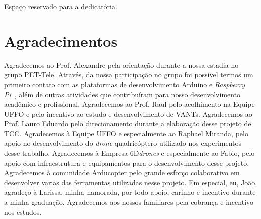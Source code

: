 \documentclass[12pt,a4paper,oneside]{book}
\begin{document}



\begin{flushright}
 \begin{minipage}{0.5\textwidth}
  \vspace{17.0cm} 
  Espaço reservado para a dedicatória.
 \end{minipage}
\end{flushright}






\chapter*{Agradecimentos}

\thispagestyle{myheadings}
%
Agradecemos ao Prof. Alexandre pela orientação durante a nossa estadia no grupo PET-Tele. Através, 
da nossa participação no grupo foi possível termos um primeiro contato com as plataformas de desenvolvimento 
Arduino e \textit{Raspberry Pi}~\cite{url:raspberrypi}, além de outras atividades que contribuíram para nosso
desenvolvimento acadêmico e profissional.
%
Agradecemos ao Prof. Raul pelo acolhimento na Equipe UFFO e pelo incentivo ao estudo e desenvolvimento 
de VANTs. 
%
Agradecemos ao Prof. Lauro Eduardo pelo direcionamento durante a elaboração desse projeto de TCC. 
%
Agradecemos à Equipe UFFO e especialmente ao Raphael Miranda, pelo apoio no desenvolvimento do \textit{drone} quadricóptero 
utilizado nos experimentos desse trabalho. 
%
Agradecemos à Empresa 6D\textit{drones} e especialmente ao Fabio, pelo apoio com infraestrutura e equipamentos para o desenvolvimento 
desse projeto.
%
Agradecemos à comunidade Arducopter pelo grande esforço colaborativo em desenvolver varias das ferramentas utilizadas nesse projeto.
%
Em especial, eu, João, agradeço à Larissa, minha namorada, por todo apoio, carinho e incentivo durante a minha graduação.
%
Agradecemos aos nossos familiares pela cobrança e incentivo nos estudos.
%
\end{document}
